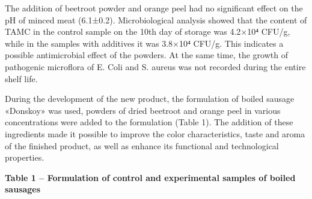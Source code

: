\begin{multicols}{2}
The addition of beetroot powder and orange peel had no significant
effect on the pH of minced meat (6.1±0.2). Microbiological analysis
showed that the content of TAMC in the control sample on the 10th day of
storage was 4.2×10⁴ CFU/g, while in the samples with additives it was
3.8×10⁴ CFU/g. This indicates a possible antimicrobial effect of the
powders. At the same time, the growth of pathogenic microflora of E.
Coli and S. aureus was not recorded during the entire shelf life.

During the development of the new product, the formulation of boiled
sausage «Donskoy» was used, powders of dried beetroot and orange peel in
various concentrations were added to the formulation (Table 1). The
addition of these ingredients made it possible to improve the color
characteristics, taste and aroma of the finished product, as well as
enhance its functional and technological properties.
\end{multicols}

{\bfseries Table 1 -- Formulation of control and experimental samples of boiled sausages}

